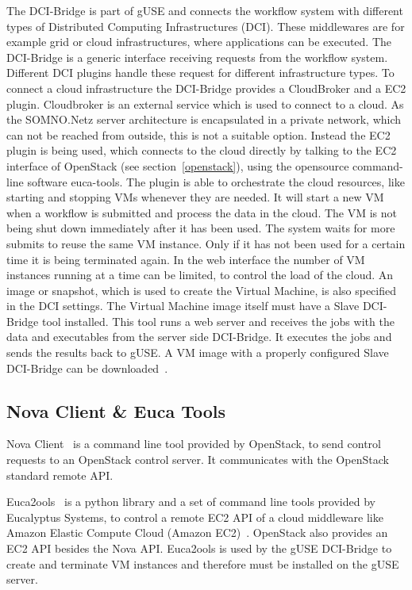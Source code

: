 The DCI-Bridge is part of gUSE and connects the workflow system with different types of Distributed Computing Infrastructures (DCI).
These middlewares are for example grid or cloud infrastructures, where applications can be executed.
The DCI-Bridge is a generic interface receiving requests from the workflow system.
Different DCI plugins handle these request for different infrastructure types.
To connect a cloud infrastructure the DCI-Bridge provides a CloudBroker and a EC2 plugin.
Cloudbroker is an external service which is used to connect to a cloud.
As the SOMNO.Netz server architecture is encapsulated in a private network, which can not be reached from outside, this is not a suitable option.
Instead the EC2 plugin is being used, which connects to the cloud directly by talking to the EC2 interface of OpenStack (see section~\ref{openstack}), using the opensource command-line software euca-tools.
The plugin is able to orchestrate the cloud resources, like starting and stopping VMs whenever they are needed.
It will start a new VM when a workflow is submitted and process the data in the cloud.
The VM is not being shut down immediately after it has been used.
The system waits for more submits to reuse the same VM instance.
Only if it has not been used for a certain time it is being terminated again.
In the web interface the number of VM instances running at a time can be limited, to control the load of the cloud. 
An image or snapshot, which is used to create the Virtual Machine, is also specified in the DCI settings.
The Virtual Machine image itself must have a Slave DCI-Bridge tool installed.
This tool runs a web server and receives the jobs with the data and executables from the server side DCI-Bridge.
It executes the jobs and sends the results back to gUSE.
A VM image with a properly configured Slave DCI-Bridge can be downloaded~\cite{slavedci}.

\subsection{Nova Client \& Euca Tools}\label{euca}
Nova Client~\cite{nova} is a command line tool provided by OpenStack, to send control requests to an OpenStack control server. It communicates with the OpenStack standard remote API.

Euca2ools~\cite{eucatools} is a python library and a set of command line tools provided by Eucalyptus Systems, to control a remote EC2 API of a cloud middleware like Amazon Elastic Compute Cloud (Amazon EC2)~\cite{amazon}.
OpenStack also provides an EC2 API besides the Nova API.
Euca2ools is used by the gUSE DCI-Bridge to create and terminate VM instances and therefore must be installed on the gUSE server.

